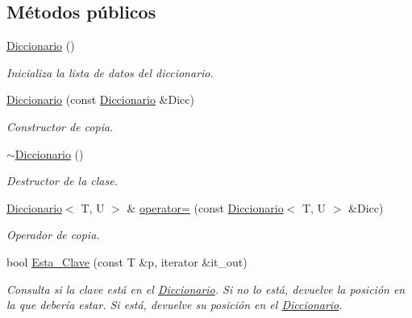 \subsection*{Métodos públicos}
\begin{DoxyCompactItemize}
\item 
\mbox{\label{classDiccionario_adad32f7bfd34b7a8631ff5f26033b369}} 
\hyperlink{classDiccionario_adad32f7bfd34b7a8631ff5f26033b369}{Diccionario} ()
\begin{DoxyCompactList}\small\item\em Inicializa la lista de datos del diccionario. \end{DoxyCompactList}\item 
\hyperlink{classDiccionario_aec12a6b43434389d8e244bb85db29149}{Diccionario} (const \hyperlink{classDiccionario}{Diccionario} \&Dicc)
\begin{DoxyCompactList}\small\item\em Constructor de copia. \end{DoxyCompactList}\item 
\mbox{\label{classDiccionario_a006b21559ae7e1b449c785fc47dfb04d}} 
\hyperlink{classDiccionario_a006b21559ae7e1b449c785fc47dfb04d}{$\sim$\+Diccionario} ()
\begin{DoxyCompactList}\small\item\em Destructor de la clase. \end{DoxyCompactList}\item 
\hyperlink{classDiccionario}{Diccionario}$<$ T, U $>$ \& \hyperlink{classDiccionario_a9e3a25d2a40117d3a99ac97e37b70f04}{operator=} (const \hyperlink{classDiccionario}{Diccionario}$<$ T, U $>$ \&Dicc)
\begin{DoxyCompactList}\small\item\em Operador de copia. \end{DoxyCompactList}\item 
bool \hyperlink{classDiccionario_a16314351b0600835ade3c7add2ffe040}{Esta\+\_\+\+Clave} (const T \&p, iterator \&it\+\_\+out)
\begin{DoxyCompactList}\small\item\em Consulta si la clave está en el \hyperlink{classDiccionario}{Diccionario}. Si no lo está, devuelve la posición en la que debería estar. Si está, devuelve su posición en el \hyperlink{classDiccionario}{Diccionario}. \end{DoxyCompactList}\item 

\end{DoxyCompactItemize}
